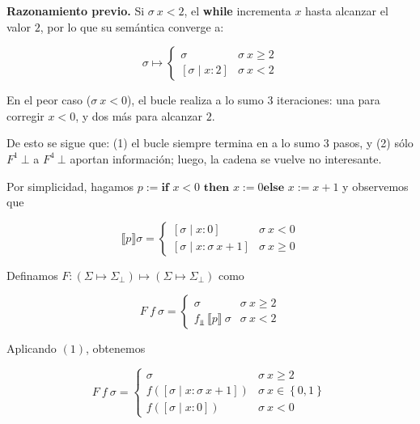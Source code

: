 \documentclass[article, 12pt]{article}
\begin{document}
\begin{helpframe}
  
\textbf{Razonamiento previo.} Si $\sigma ~ x < 2$, el \textbf{while} incrementa $x$ hasta alcanzar el valor $2$, por lo que su semántica converge a:

\[
\sigma \mapsto 
\begin{cases}
\sigma & \sigma ~ x \geq 2 \\
[\sigma \mid x : 2] & \sigma ~ x < 2
\end{cases}
\]

En el peor caso ($\sigma ~ x < 0$), el bucle realiza a lo sumo $3$ iteraciones: una para corregir $x < 0$, y dos más para alcanzar $2$.

De esto se sigue que: (1) el bucle siempre termina en a lo sumo $3$ pasos, y (2)
sólo $F^1 ~ \bot$ a $F^4 ~ \bot$ aportan información; luego, la cadena se vuelve
no interesante.
\end{helpframe}

Por simplicidad, hagamos $p := \textbf{if } x < 0 \textbf{ then } x:=0 \textbf{
else } x := x+1$ y observemos que

\begin{equation}
  \llbracket p \rrbracket \sigma = \begin{cases}
    [\sigma \mid x : 0] & \sigma ~x < 0 \\ 
    [\sigma \mid x : \sigma ~ x + 1] & \sigma~ x \geq 0
  \end{cases}
\end{equation}

Definamos $F : (\Sigma
\mapsto \Sigma_\bot ) \mapsto (\Sigma \mapsto \Sigma_\bot )$ como 

\begin{equation*}
  F ~ f ~ \sigma = \begin{cases}
    \sigma & \sigma ~ x \geq 2 \\ 
    f_{\Bot} ~ \llbracket p \rrbracket ~ \sigma & \sigma ~ x < 2
  \end{cases}
\end{equation*}

Aplicando $(1)$, obtenemos


\begin{equation*}
  F ~ f ~\sigma = \begin{cases}
    \sigma & \sigma ~ x \geq 2 \\ 
    f \left( [\sigma \mid x : \sigma ~ x + 1] \right) & \sigma ~ x \in \left\{
    0, 1 \right\} \\
    f \left( [\sigma \mid x : 0] \right) &\sigma ~ x < 0
  \end{cases}
\end{equation*}
\end{document}
